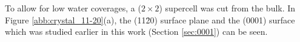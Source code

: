 \documentclass[11pt,DIV=13,BCOR=5mm,a4paper,headinclude]{scrbook}
\begin{document}
To allow for low water coverages, a ($2\times 2$) supercell was cut from the bulk.
In Figure \ref{abb:crystal_11-20}(a), the (11\=20) surface plane and the (0001) surface which was studied earlier in this work (Section \ref{sec:0001}) can be seen.
\begin{figure}[!h]
    \centering
             \quad
             \quad

\end{figure}
\end{document}
